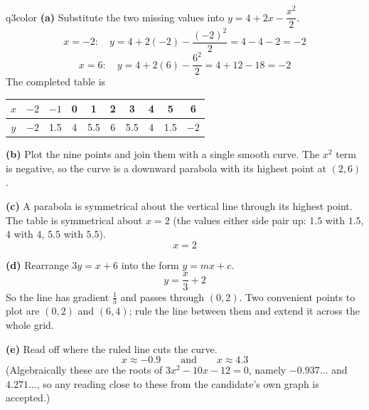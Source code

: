 \documentclass[11pt,a4paper]{article}
\begin{document}
\begin{ansbox}{q3color}
\textbf{(a)} Substitute the two missing values into $y = 4 + 2x - \dfrac{x^2}{2}$.
\[ x = -2: \quad y = 4 + 2(-2) - \frac{(-2)^2}{2} = 4 - 4 - 2 = -2 \]
\[ x = 6: \quad y = 4 + 2(6) - \frac{6^2}{2} = 4 + 12 - 18 = -2 \]
The completed table is
\begin{center}
\begin{tabular}{|c|c|c|c|c|c|c|c|c|c|}
\hline
$x$ & $-2$ & $-1$ & 0 & 1 & 2 & 3 & 4 & 5 & 6 \\ \hline
$y$ & $-2$ & 1.5 & 4 & 5.5 & 6 & 5.5 & 4 & 1.5 & $-2$ \\ \hline
\end{tabular}
\end{center}

\textbf{(b)} Plot the nine points and join them with a single smooth curve. The $x^2$ term is negative, so the curve is a downward parabola with its highest point at $(2, 6)$.

\textbf{(c)} A parabola is symmetrical about the vertical line through its highest point. The table is symmetrical about $x = 2$ (the values either side pair up: $1.5$ with $1.5$, $4$ with $4$, $5.5$ with $5.5$).
\[ x = 2 \]

\textbf{(d)} Rearrange $3y = x + 6$ into the form $y = mx + c$.
\[ y = \frac{x}{3} + 2 \]
So the line has gradient $\tfrac{1}{3}$ and passes through $(0, 2)$. Two convenient points to plot are $(0, 2)$ and $(6, 4)$; rule the line between them and extend it across the whole grid.

\begin{center}
\end{center}

\textbf{(e)} Read off where the ruled line cuts the curve.
\[ x \approx -0.9 \qquad \text{and} \qquad x \approx 4.3 \]
(Algebraically these are the roots of $3x^2 - 10x - 12 = 0$, namely $-0.937\ldots$ and $4.271\ldots$, so any reading close to these from the candidate's own graph is accepted.)
\end{ansbox}
\end{document}
